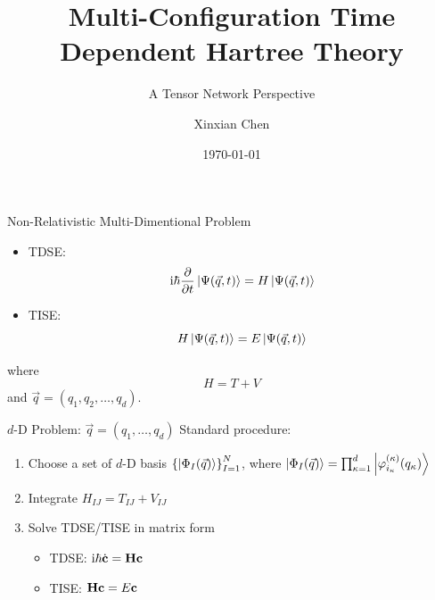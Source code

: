 \documentclass[12pt]{beamer}
\let\temp\phi
\let\phi\varphi
\let\varphi\temp
\newcommand{\iu}{\mathrm{i}}
\begin{document}
    \title{Multi-Configuration Time Dependent Hartree Theory}
    \subtitle{A Tensor Network Perspective}
    \author{Xinxian Chen}
    \date{\today}

    \frame{\titlepage}

    \begin{frame}{Non-Relativistic Multi-Dimentional Problem}
        \begin{itemize}
            \item TDSE:
            \begin{equation*}
                \iu \hbar \pdv{t} \ket{\Psi(\vec{q}, t)} = H \ket{\Psi(\vec{q}, t)}
            \end{equation*}
            \item TISE:
            \begin{equation*}
                H \ket{\Psi(\vec{q}, t)} = E \ket{\Psi(\vec{q}, t)}
            \end{equation*}
        \end{itemize}
        
        where $$H = T + V$$
        and $\vec{q} = \left(q_1, q_2, \ldots, q_d\right)$.
    \end{frame}

    \begin{frame}{$d$-D Problem: $\vec{q} = (q_1, \ldots, q_d)$}
        Standard procedure:
        \begin{enumerate}
            \item Choose a set of $d$-D basis $\left\{ \ket{\Phi_I(\vec{q})} \right\}^N_{I=1}$, where $\ket{\Phi_I(\vec{q})} = \prod_{\kappa=1}^d \ket{\phi^{(\kappa)}_{i_\kappa}(q_\kappa)}$
            \item Integrate $H_{IJ} = T_{IJ} + V_{IJ}$
            \item Solve TDSE/TISE in matrix form
            \begin{itemize}
                \item TDSE: $\iu \hbar \dot{\vb{c}} = \vb{H} \vb{c} $
                \item TISE: $\vb{H} \vb{c} = E \vb{c} $
            \end{itemize}
        \end{enumerate}
    \end{frame}
\end{document}
